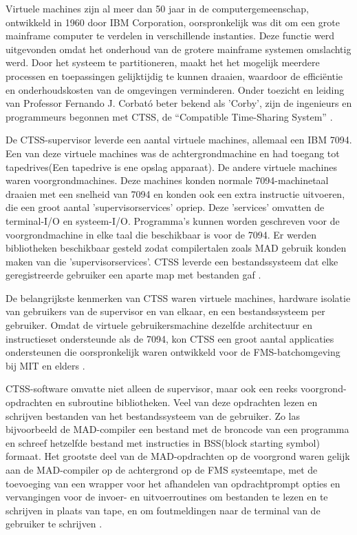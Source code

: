Virtuele machines zijn al meer dan 50 jaar in de computergemeenschap, ontwikkeld in 1960 door IBM Corporation, oorspronkelijk was dit om een grote mainframe computer te verdelen in verschillende instanties. Deze functie werd uitgevonden omdat het onderhoud van de grotere mainframe systemen omslachtig werd. Door het systeem te partitioneren, maakt het het mogelijk meerdere processen en toepassingen gelijktijdig te kunnen draaien, waardoor de efficiëntie en onderhoudskosten van de omgevingen verminderen. Onder toezicht en leiding van Professor Fernando J. Corbató beter bekend als 'Corby', zijn de ingenieurs en programmeurs begonnen met CTSS, de “Compatible Time-Sharing System” \autocite{Radhwan2013}.

De CTSS-supervisor leverde een aantal virtuele machines, allemaal een IBM 7094. Een van deze virtuele machines was de achtergrondmachine en had toegang tot tapedrives(Een tapedrive is ene opslag apparaat). De andere virtuele machines waren voorgrondmachines. Deze machines konden normale 7094-machinetaal draaien met een snelheid van 7094 en konden ook een extra instructie uitvoeren, die een groot aantal 'supervisorservices' opriep. Deze 'services' omvatten de terminal-I/O en systeem-I/O. Programma's kunnen worden geschreven voor de voorgrondmachine in elke taal die beschikbaar is voor de 7094. Er werden bibliotheken beschikbaar gesteld zodat compilertalen zoals MAD gebruik konden maken van die 'supervisorservices'. CTSS leverde een bestandssysteem dat elke geregistreerde gebruiker een aparte map met bestanden gaf \autocite{VanVleck2015}.

De belangrijkste kenmerken van CTSS waren virtuele machines, hardware isolatie van gebruikers van de supervisor en van elkaar, en een bestandssysteem per gebruiker. Omdat de virtuele gebruikersmachine dezelfde architectuur en instructieset ondersteunde als de 7094, kon CTSS een groot aantal applicaties ondersteunen die oorspronkelijk waren ontwikkeld voor de FMS-batchomgeving bij MIT en elders \autocite{VanVleck2015}.

CTSS-software omvatte niet alleen de supervisor, maar ook een reeks voorgrond-opdrachten en subroutine bibliotheken. Veel van deze  opdrachten lezen en schrijven bestanden van het bestandssysteem van de gebruiker. Zo las bijvoorbeeld de MAD-compiler een bestand met de broncode van een programma en schreef hetzelfde bestand met instructies in BSS(block starting symbol) formaat. Het grootste deel van de MAD-opdrachten op de voorgrond waren gelijk aan de MAD-compiler op de achtergrond op de FMS systeemtape, met de toevoeging van een wrapper voor het afhandelen van opdrachtprompt opties en vervangingen voor de invoer- en uitvoerroutines om bestanden te lezen en te schrijven in plaats van tape, en om foutmeldingen naar de terminal van de gebruiker te schrijven \autocite{VanVleck2015}.

